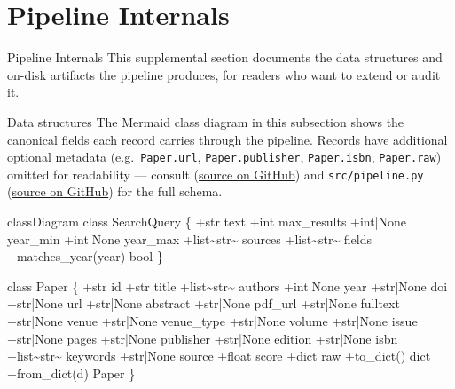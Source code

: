 \documentclass[
  ignorenonframetext,
]{beamer}
\author{\texorpdfstring{}{}}
\date{}
\newenvironment{Shaded}{}{}
\newcommand{\NormalTok}[1]{#1}
\begin{document}
\section{Pipeline Internals}\label{sec:pipeline_internals}

\begin{frame}[allowframebreaks]{Pipeline Internals}
This supplemental section documents the data structures and on-disk
artifacts the pipeline produces, for readers who want to extend or audit
it.
\end{frame}

\begin{frame}{Data structures}
\protect{}\label{data-structures}
The Mermaid class diagram in this subsection shows the canonical fields
each record carries through the pipeline. Records have additional
optional metadata (e.g.~\texttt{Paper.url}, \texttt{Paper.publisher},
\texttt{Paper.isbn}, \texttt{Paper.raw}) omitted for readability ---
consult 
(\href{https://github.com/docxology/template/tree/main/infrastructure/search/literature}{source
on GitHub}) and \texttt{src/pipeline.py}
(\href{https://github.com/docxology/template/tree/main/projects/templates/template_search_project/src}{source
on GitHub}) for the full schema.

\begin{Shaded}
\begin{Highlighting}[]
\NormalTok{classDiagram}
\NormalTok{    class SearchQuery \{}
\NormalTok{        +str text}
\NormalTok{        +int max\_results}
\NormalTok{        +int|None year\_min}
\NormalTok{        +int|None year\_max}
\NormalTok{        +list\textasciitilde{}str\textasciitilde{} sources}
\NormalTok{        +list\textasciitilde{}str\textasciitilde{} fields}
\NormalTok{        +matches\_year(year) bool}
\NormalTok{    \}}

\NormalTok{    class Paper \{}
\NormalTok{        +str id}
\NormalTok{        +str title}
\NormalTok{        +list\textasciitilde{}str\textasciitilde{} authors}
\NormalTok{        +int|None year}
\NormalTok{        +str|None doi}
\NormalTok{        +str|None url}
\NormalTok{        +str|None abstract}
\NormalTok{        +str|None pdf\_url}
\NormalTok{        +str|None fulltext}
\NormalTok{        +str|None venue}
\NormalTok{        +str|None venue\_type}
\NormalTok{        +str|None volume}
\NormalTok{        +str|None issue}
\NormalTok{        +str|None pages}
\NormalTok{        +str|None publisher}
\NormalTok{        +str|None edition}
\NormalTok{        +str|None isbn}
\NormalTok{        +list\textasciitilde{}str\textasciitilde{} keywords}
\NormalTok{        +str|None source}
\NormalTok{        +float score}
\NormalTok{        +dict raw}
\NormalTok{        +to\_dict() dict}
\NormalTok{        +from\_dict(d) Paper}
\NormalTok{    \}}


\end{Highlighting}
\end{Shaded}
\end{frame}
\end{document}
